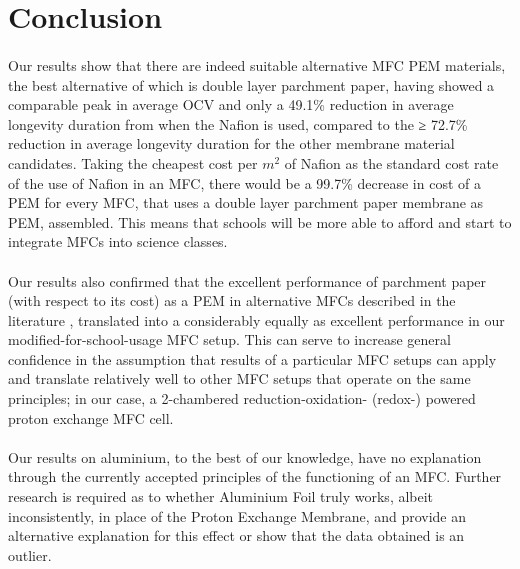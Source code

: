 \documentclass[12pt, twocolumn, a4paper]{article}
\begin{document}
\section{Conclusion}
\paragraph{}Our results show that there are indeed suitable alternative MFC PEM materials, the best alternative of which is double layer parchment paper, having showed a comparable peak in average OCV and only a 49.1\% reduction in average longevity duration from when the Nafion\texttrademark{} is used, compared to the ≥ 72.7\% reduction in average longevity duration for the other membrane material candidates. Taking the cheapest cost per $m^2$ of Nafion\texttrademark{} as the standard cost rate of the use of Nafion\texttrademark{} in an MFC, there would be a 99.7\% decrease in cost of a PEM for every MFC, that uses a double layer parchment paper membrane as PEM, assembled. This means that schools will be more able to afford and start to integrate MFCs into science classes.

\paragraph{}Our results also confirmed that the excellent performance of parchment paper (with respect to its cost) as a PEM in alternative MFCs described in the literature \cite{C4CP04804K, C5AN00492F, Lee2016-xq}, translated into a considerably equally as excellent performance in our modified-for-school-usage MFC setup. This can serve to increase general confidence in the assumption that results of a particular MFC setups can apply and translate relatively well to other MFC setups that operate on the same principles; in our case, a 2-chambered reduction-oxidation- (redox-) powered proton exchange MFC cell.

\paragraph{}Our results on aluminium, to the best of our knowledge, have no explanation through the currently accepted principles of the functioning of an MFC. Further research is required as to whether Aluminium Foil truly works, albeit inconsistently, in place of the Proton Exchange Membrane, and provide an alternative explanation for this effect or show that the data obtained is an outlier.
\end{document}
